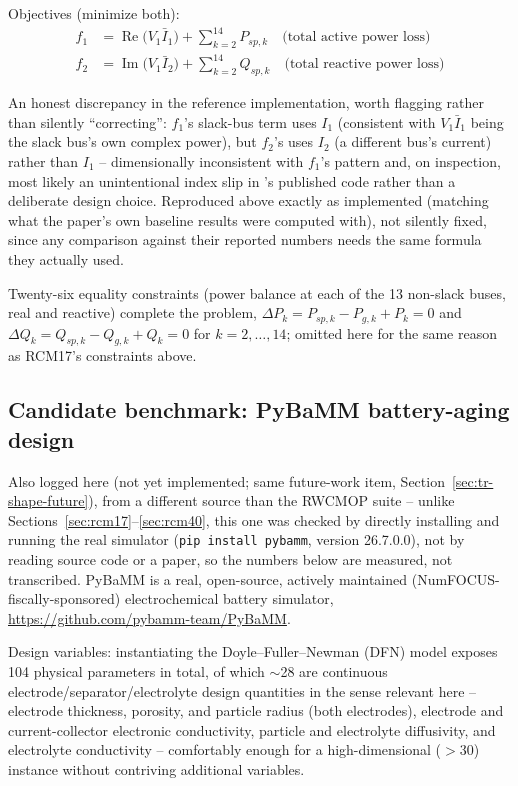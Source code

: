 \documentclass[11pt]{article}
\begin{document}
Objectives (minimize both):
\begin{align}
f_1 &= \operatorname{Re}\!\big(V_1 \bar{I}_1\big) + \textstyle\sum_{k=2}^{14} P_{sp,k} \quad \text{(total active power loss)} \\
f_2 &= \operatorname{Im}\!\big(V_1 \bar{I}_2\big) + \textstyle\sum_{k=2}^{14} Q_{sp,k} \quad \text{(total reactive power loss)}
\end{align}

An honest discrepancy in the reference implementation, worth flagging rather
than silently ``correcting'': $f_1$'s slack-bus term uses $I_1$ (consistent
with $V_1 \bar{I}_1$ being the slack bus's own complex power), but $f_2$'s
uses $I_2$ (a different bus's current) rather than $I_1$ -- dimensionally
inconsistent with $f_1$'s pattern and, on inspection, most likely an
unintentional index slip in \citep{kumar2021rwcmop}'s published code rather
than a deliberate design choice. Reproduced above exactly as implemented
(matching what the paper's own baseline results were computed with), not
silently fixed, since any comparison against their reported numbers needs
the same formula they actually used.

Twenty-six equality constraints (power balance at each of the 13 non-slack
buses, real and reactive) complete the problem, $\Delta P_k = P_{sp,k} -
P_{g,k} + P_k = 0$ and $\Delta Q_k = Q_{sp,k} - Q_{g,k} + Q_k = 0$ for
$k = 2, \ldots, 14$; omitted here for the same reason as RCM17's
constraints above.

\subsection{Candidate benchmark: PyBaMM battery-aging design}
\label{sec:pybamm}

Also logged here (not yet implemented; same future-work item,
Section~\ref{sec:tr-shape-future}), from a different source than the
RWCMOP suite -- unlike Sections~\ref{sec:rcm17}--\ref{sec:rcm40}, this one
was checked by directly installing and running the real simulator
(\texttt{pip install pybamm}, version 26.7.0.0), not by reading source
code or a paper, so the numbers below are measured, not transcribed.
PyBaMM \citep{sulzer2021pybamm} is a real, open-source, actively
maintained (NumFOCUS-fiscally-sponsored) electrochemical battery
simulator, \url{https://github.com/pybamm-team/PyBaMM}.

Design variables: instantiating the Doyle--Fuller--Newman (DFN) model
exposes 104 physical parameters in total, of which $\sim$28 are
continuous electrode/separator/electrolyte design quantities in the sense
relevant here -- electrode thickness, porosity, and particle radius (both
electrodes), electrode and current-collector electronic conductivity,
particle and electrolyte diffusivity, and electrolyte conductivity --
comfortably enough for a high-dimensional ($>$30) instance without
contriving additional variables.
\end{document}
